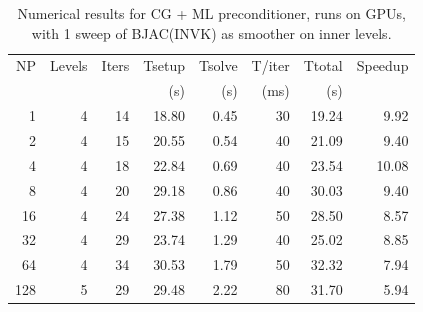 \begin{table}[h!]
\centering
\caption{Numerical results for CG + ML preconditioner, runs on GPUs, with 1 sweep of BJAC(INVK) as smoother on inner levels.}
\label{gpu-invk}

\begin{tabular}{rrrrrrrr}
NP  & Levels & Iters & Tsetup & Tsolve & T/iter & Ttotal & Speedup\\
    &        &       & (s)    & (s)    & (ms)   & (s)   &  \\
\hline
1   & 4       & 14  & 18.80 & 0.45 & 30   & 19.24& 9.92  \\
2   & 4       & 15  & 20.55 & 0.54 & 40   & 21.09& 9.40  \\
4   & 4       & 18  & 22.84 & 0.69 & 40   & 23.54& 10.08 \\
8   & 4       & 20  & 29.18 & 0.86 & 40   & 30.03& 9.40  \\
16  & 4       & 24  & 27.38 & 1.12 & 50   & 28.50& 8.57  \\
32  & 4       & 29  & 23.74 & 1.29 & 40   & 25.02& 8.85  \\
64  & 4       & 34  & 30.53 & 1.79 & 50   & 32.32& 7.94  \\
128 & 5       & 29  & 29.48 & 2.22 & 80   & 31.70& 5.94  \\
\hline
\end{tabular}
\end{table}
\else

